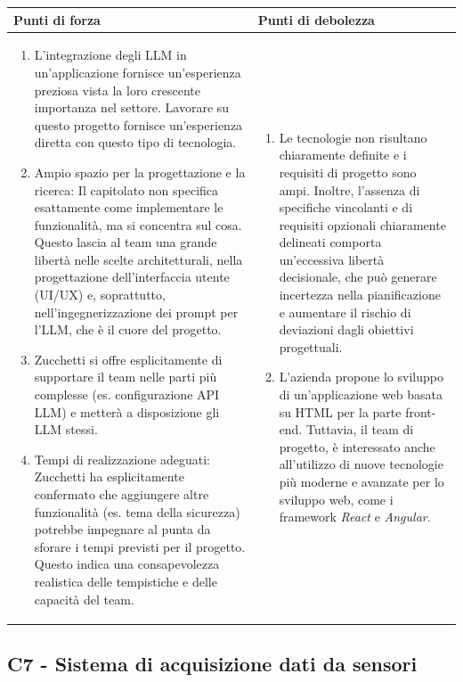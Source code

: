 \documentclass[a4paper,11pt]{article}
\begin{document}
{\footnotesize
\begin{tabularx}{\textwidth}{|X|X|}
\hline
\rowcolor{lightgray!40} %
\textbf{Punti di forza} & \textbf{Punti di debolezza} \\
\hline
\begin{enumerate}
\item L'integrazione degli LLM in un'applicazione fornisce un'esperienza preziosa vista la loro crescente importanza nel settore. Lavorare su questo progetto fornisce un'esperienza diretta con questo tipo di tecnologia.
\item Ampio spazio per la progettazione e la ricerca: Il capitolato non specifica esattamente come implementare le funzionalità, ma si concentra sul cosa. Questo lascia al team una grande libertà nelle scelte architetturali, nella progettazione dell'interfaccia utente (UI/UX) e, soprattutto, nell'ingegnerizzazione dei prompt per l'LLM, che è il cuore del progetto.
\item Zucchetti si offre esplicitamente di supportare il team nelle parti più complesse (es. configurazione API LLM) e metterà a disposizione gli LLM stessi. 
\item Tempi di realizzazione adeguati: Zucchetti ha esplicitamente confermato che aggiungere altre funzionalità (es. tema della sicurezza) potrebbe impegnare al punta da sforare i tempi previsti per il progetto. Questo indica una consapevolezza realistica delle tempistiche e delle capacità del team.
\end{enumerate}
 & \begin{enumerate}
\item Le tecnologie non risultano chiaramente definite e i requisiti di progetto sono ampi. Inoltre, l'assenza di specifiche vincolanti e di requisiti opzionali chiaramente delineati comporta un'eccessiva libertà decisionale, che può generare incertezza nella pianificazione e aumentare il rischio di deviazioni dagli obiettivi progettuali.
\item L'azienda propone lo sviluppo di un'applicazione web basata su HTML per la parte front-end. Tuttavia, il team di progetto, è interessato anche all'utilizzo di nuove tecnologie più moderne e avanzate per lo sviluppo web, come i framework \textit{React} e \textit{Angular}. 
\end{enumerate} \\
\hline
\end{tabularx}
}
\subsection{C7 - Sistema di acquisizione dati da sensori}
\end{document}
